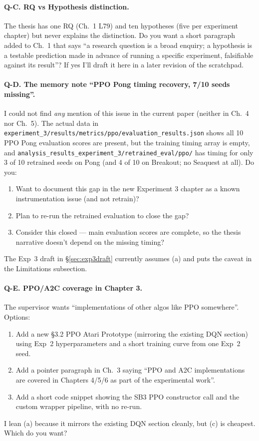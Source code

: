 \documentclass[11pt,a4paper]{article}
\newcommand{\fileline}[1]{\texttt{\small #1}}
\newcommand{\qlabel}[1]{\textbf{\color{blue!50!black} Q-#1.}}
\begin{document}
\paragraph{\qlabel{C} RQ vs Hypothesis distinction.}
The thesis has one RQ (Ch.~1 L79) and ten hypotheses (five per experiment
chapter) but never explains the distinction. Do you want a short paragraph
added to Ch.~1 that says ``a research question is a broad enquiry; a
hypothesis is a testable prediction made in advance of running a specific
experiment, falsifiable against its result''? If yes I'll draft it here
in a later revision of the scratchpad.

\paragraph{\qlabel{D} The memory note ``PPO Pong timing recovery, 7/10
seeds missing''.}
I could not find \emph{any} mention of this issue in the current paper
(neither in Ch.~4 nor Ch.~5). The actual data in
\fileline{experiment\_3/results/metrics/ppo/evaluation\_results.json} shows
all 10 PPO Pong evaluation scores are present, but the training timing
array is empty, and
\fileline{analysis\_results\_experiment\_3/retrained\_eval/ppo/} has
timing for only 3 of 10 retrained seeds on Pong (and 4 of 10 on
Breakout; no Seaquest at all). Do you:
\begin{enumerate}[label=(\alph*),leftmargin=*]
  \item Want to document this gap in the new Experiment 3 chapter as a
  known instrumentation issue (and not retrain)?
  \item Plan to re-run the retrained evaluation to close the gap?
  \item Consider this closed --- main evaluation scores are complete, so
  the thesis narrative doesn't depend on the missing timing?
\end{enumerate}
The Exp~3 draft in \S\ref{sec:exp3draft} currently assumes (a) and puts
the caveat in the Limitations subsection.

\paragraph{\qlabel{E} PPO/A2C coverage in Chapter 3.}
The supervisor wants ``implementations of other algos like PPO somewhere''.
Options:
\begin{enumerate}[label=(\alph*),leftmargin=*]
  \item Add a new \S3.2 PPO Atari Prototype (mirroring the existing DQN
  section) using Exp~2 hyperparameters and a short training curve from one
  Exp~2 seed.
  \item Add a pointer paragraph in Ch.~3 saying ``PPO and A2C
  implementations are covered in Chapters 4/5/6 as part of the
  experimental work''.
  \item Add a short code snippet showing the SB3 PPO constructor call and
  the custom wrapper pipeline, with no re-run.
\end{enumerate}
I lean (a) because it mirrors the existing DQN section cleanly, but (c)
is cheapest. Which do you want?
\end{document}
